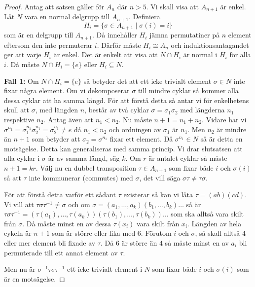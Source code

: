 \documentclass{article}
\theoremstyle{definition}
\begin{document}
\begin{proof}
  Antag att satsen gäller för $A_n$ där $n > 5$. Vi skall visa att $A_{n+1}$ är enkel. Låt $N$ vara en normal delgrupp till $A_{n+1}$.
  Definiera 
  \[H_i = \{\sigma \in A_{n+1} \; | \; \sigma(i) = i\}\]
  som är en delgrupp till $A_{n+1}$. Då innehåller $H_i$ jämna permutatiner på $n$ element eftersom den inte permuterar $i$. Därför 
  måste $H_i \cong A_n$ och induktionsantagandet ger att varje $H_i$ är enkel. Det är enkelt att visa att $N \cap H_i$ är normal i $H_i$
  för alla $i$. Då måste $N \cap H_i = \{e\}$ eller $H_i \subseteq N$.

  \textbf{Fall 1:} Om $N \cap H_i = \{e\}$ så betyder det att ett icke trivialt element $\sigma \in N$ inte fixar några element. 
  Om vi dekomposerar $\sigma$ till mindre cyklar så kommer alla dessa cyklar att ha samma längd. För att förstå detta så antar vi för enkelhetens skull
  att $\sigma$, med längden $n$, består av två cyklar $\sigma = \sigma_1 \sigma_2$ med längderna $n_1$ respektive $n_2$. Antag även att $n_1 < n_2$. 
  Nu måste $n +1 = n_1 + n_2$. 
  Vidare har vi $\sigma^{n_1} = \sigma_1^{n_1} \sigma_2^{n_1} = \sigma_2^{n_1} \neq e$ då $n_1 < n_2$ och ordningen av $\sigma_1$ är $n_1$.
  Men $n_2$ är mindre än $n+1$ som betyder att $\sigma_2 = \sigma^{n_1}$ fixar ett element. Då $\sigma^{n_1} \in N$ så är detta en motsägelse. 
  Detta kan generaliseras med samma princip. Vi drar slutsatsen att alla cyklar i $\sigma$ är av samma längd, säg $k$. Om $r$ är antalet cyklar 
  så måste $n + 1 = kr$. Välj nu en dubbel transposition $\tau \in A_{n+1}$ som fixar både $i$ och $\sigma(i)$ så att $\tau$ inte 
  kommunerar (commutes) med $\sigma$, det vill säga $\sigma \tau \neq \tau \sigma$. 
  
  För att förstå detta varför ett sådant $\tau$ existerar så kan vi låta $\tau = (ab)(cd)$. Vi vill att $\tau \sigma \tau^{-1} \neq \sigma$
  och om $\sigma = (a_1, \ldots, a_k)(b_1, \ldots, b_k) \ldots$ så är 
  $\tau \sigma \tau^{-1} = (\tau(a_1), \ldots, \tau(a_k))(\tau(b_1), \ldots, \tau(b_k)) \ldots$
  som ska alltså vara skilt från $\sigma$. Då måste minst en av dessa $\tau(x_i)$ vara skilt från $x_i$. Längden av hela cykeln är $n+1$
  som är större eller lika med $6$. Förutom $i$ och $\sigma$, så skall alltså $4$ eller mer element bli fixade av $\tau$. 
  Då $6$ är större än $4$ så måste minst en av $a_i$ bli permuterade till ett annat element av $\tau$.
  
  Men nu är $\sigma^{-1}\tau \sigma \tau^{-1}$ ett icke trivialt element i $N$ som fixar både $i$ och $\sigma(i)$ som är en motsägelse.


\end{proof}
\end{document}
